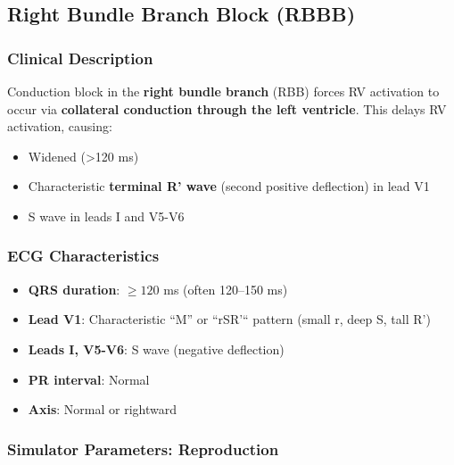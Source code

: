 \documentclass[12pt,a4paper,oneside]{book}
\begin{document}
\subsection{Right Bundle Branch Block (RBBB)}

\subsubsection{Clinical Description}

Conduction block in the \textbf{right bundle branch} (RBB) forces RV activation to occur via \textbf{collateral conduction through the left ventricle}. This delays RV activation, causing:

\begin{itemize}
    \item Widened \QRS (>120 ms)
    \item Characteristic \textbf{terminal R' wave} (second positive deflection) in lead V1
    \item S wave in leads I and V5-V6
\end{itemize}

\subsubsection{ECG Characteristics}

\begin{itemize}
    \item \textbf{QRS duration}: $\geq 120$ ms (often 120–150 ms)
    \item \textbf{Lead V1}: Characteristic ``M'' or ``rSR'`` pattern (small r, deep S, tall R')
    \item \textbf{Leads I, V5-V6}: S wave (negative deflection)
    \item \textbf{PR interval}: Normal
    \item \textbf{Axis}: Normal or rightward
\end{itemize}

\subsubsection{Simulator Parameters: Reproduction}
\end{document}
